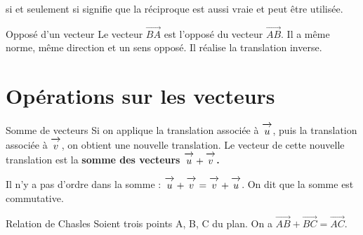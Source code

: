 \documentclass[10pt,a4paper,openany,twoside,prof]{book}
\begin{document}
\begin{rem}{}{}
  \og si et seulement si \fg{} signifie que la réciproque est aussi vraie et peut être utilisée.
\end{rem}

\begin{defi}{Opposé d'un vecteur}{}
		Le vecteur $\vec{BA}$ est l'opposé du vecteur $\vec{AB}$. Il a même norme, même direction et un sens opposé. Il réalise la translation inverse.

		\begin{center}
		\end{center}

\end{defi}

\section{Opérations sur les vecteurs}

\begin{defi}{Somme de vecteurs}{}
	Si on applique la translation associée à  $\overrightarrow{\,\mathstrut u\,}$, puis la translation associée à $\overrightarrow{\,\mathstrut v\,}$, on obtient une nouvelle translation. Le vecteur de cette nouvelle translation est la \bf{somme des vecteurs} $\overrightarrow{\,\mathstrut u\,}+\overrightarrow{\,\mathstrut v\,}$.

	\begin{center}
	\end{center}

\end{defi}

\begin{prop}{}{}
	Il n'y a pas d'ordre dans la somme : $\overrightarrow{\,\mathstrut u\,}+\overrightarrow{\,\mathstrut v\,} = \overrightarrow{\,\mathstrut v\,}+\overrightarrow{\,\mathstrut u\,}$. On dit que la somme est commutative.
\end{prop}

\begin{theo}{Relation de Chasles}{}
	Soient trois points A, B, C du plan. On a $\vec{AB}+\vec{BC}=\vec{AC}$.
		\begin{center}
	\end{center}
\end{theo}
\end{document}
